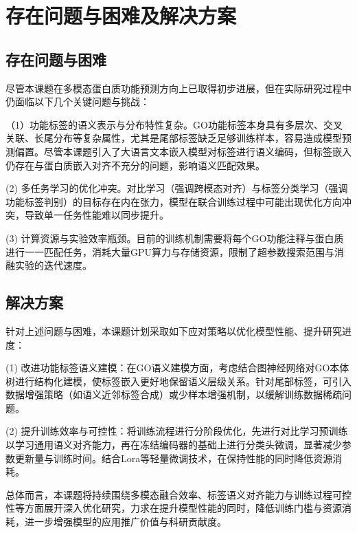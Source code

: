 \chapter{存在问题与困难及解决方案}

\section{存在问题与困难}
尽管本课题在多模态蛋白质功能预测方向上已取得初步进展，但在实际研究过程中仍面临以下几个关键问题与挑战：

（1）功能标签的语义表示与分布特性复杂。GO功能标签本身具有多层次、交叉关联、长尾分布等复杂属性，尤其是尾部标签缺乏足够训练样本，容易造成模型预测偏置。尽管本课题引入了大语言文本嵌入模型对标签进行语义编码，但标签嵌入仍存在与蛋白质嵌入对齐不充分的问题，影响语义匹配效果。

(2) 多任务学习的优化冲突。对比学习（强调跨模态对齐）与标签分类学习（强调功能标签判别）的目标存在内在张力，模型在联合训练过程中可能出现优化方向冲突，导致单一任务性能难以同步提升。

(3) 计算资源与实验效率瓶颈。目前的训练机制需要将每个GO功能注释与蛋白质进行一一匹配任务，消耗大量GPU算力与存储资源，限制了超参数搜索范围与消融实验的迭代速度。

\section{解决方案}
针对上述问题与困难，本课题计划采取如下应对策略以优化模型性能、提升研究进度：

(1) 改进功能标签语义建模：在GO语义建模方面，考虑结合图神经网络对GO本体树进行结构化建模，使标签嵌入更好地保留语义层级关系。针对尾部标签，可引入数据增强策略（如语义近邻标签合成）或少样本增强机制，以缓解训练数据稀疏问题。

(2) 提升训练效率与可控性：将训练流程进行分阶段优化，先进行对比学习预训练以学习通用语义对齐能力，再在冻结编码器的基础上进行分类头微调，显著减少参数更新量与训练时间。结合Lora等轻量微调技术，在保持性能的同时降低资源消耗。

总体而言，本课题将持续围绕多模态融合效率、标签语义对齐能力与训练过程可控性等方面展开深入优化研究，力求在提升模型性能的同时，降低训练门槛与资源消耗，进一步增强模型的应用推广价值与科研贡献度。


